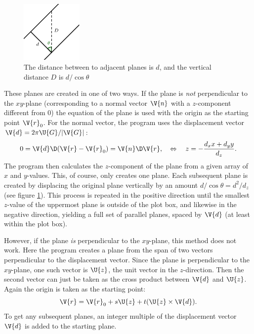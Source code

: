 \documentclass[main.tex]{subfiles}
\begin{document}
	\begin{figure}
		\includegraphics[width=3cm]{figures/plane_distance.pdf}
		\caption{The distance between to adjacent planes is $ d $, and the vertical distance $ D $ is $ d/\cos \theta$}
		\label{fig:plane_distance}
	\end{figure}
	
	These planes are created in one of two ways. If the plane is \textit{not} perpendicular to the $ xy $-plane (corresponding to a normal vector $ \V{n} $ with a $ z $-component different from 0) the equation of the plane is used with the origin as the starting point $ \V{r}_0 $. For the normal vector, the program uses the displacement vector $ \V{d} = 2\pi \U{G} / |\V{G}| $:
	\begin{equation}
		0 = \V{d} \D (\V{r}-\V{r}_0) = \V{n} \D \V{r}, \quad \Leftrightarrow \quad z = -\frac{d_x x + d_y y}{d_z}.
	\end{equation}
	The program then calculates the $ z $-component of the plane from a given array of $ x $ and $ y $-values. This, of course, only creates one plane. Each subsequent plane is created by displacing the original plane vertically by an amount $ d/\cos \theta = d^2/d_z$ (see figure \ref{fig:plane_distance}). This process is repeated in the positive direction until the smallest $ z $-value of the uppermost plane is outside of the plot box, and likewise in the negative direction, yielding a full set of parallel planes, spaced by $ \V{d} $ (at least within the plot box).
	
	However, if the plane \textit{is} perpendicular to the $ xy $-plane, this method does not work. Here the program creates a plane from the span of two vectors perpendicular to the displacement vector. Since the plane is perpendicular to the $ xy $-plane, one such vector is $ \U{z} $, the unit vector in the $ z $-direction. Then the second vector can just be taken as the cross product between $ \V{d} $ and $ \U{z} $. Again the origin is taken as the starting point:
	\begin{equation}
		\V{r} = \V{r}_0 + s \U{z} + t (\U{z} \times \V{d}).
	\end{equation}
	To get any subsequent planes, an integer multiple of the displacement vector $ \V{d} $ is added to the starting plane.
	
\end{document}
